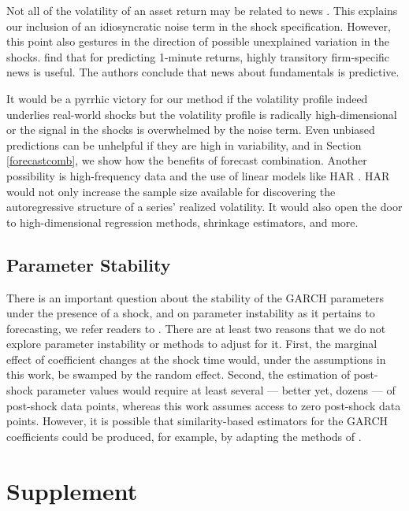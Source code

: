\documentclass[11pt,3p,review,authoryear]{elsarticle}
\theoremstyle{definition}
\begin{document}
Not all of the volatility of an asset return may be related to news \citep{boudoukh2019information}.  This explains our inclusion of an idiosyncratic noise term in the shock specification.  However, this point also gestures in the direction of possible unexplained variation in the shocks.  \citet{chinco2019sparse} find that for predicting 1-minute returns, highly transitory firm-specific news is useful.  The authors conclude that news about fundamentals is predictive.

It would be a pyrrhic victory for our method if the volatility profile indeed underlies real-world shocks but the volatility profile is radically high-dimensional or the signal in the shocks is overwhelmed by the noise term.  Even unbiased predictions can be unhelpful if they are high in variability, and in Section \ref{forecastcomb}, we show how the benefits of forecast combination.  Another possibility is high-frequency data and the use of linear models like HAR \citep{corsi2012har}.  HAR would not only increase the sample size available for discovering the autoregressive structure of a series' realized volatility.  It would also open the door to high-dimensional regression methods, shrinkage estimators, and more.

\subsection{Parameter Stability}

There is an important question about the stability of the GARCH parameters under the presence of a shock, and on parameter instability as it pertains to forecasting, we refer readers to \cite{rossi2013advances, rossi2021forecasting}.  There are at least two reasons that we do not explore parameter instability or methods to adjust for it.  First, the marginal effect of coefficient changes at the shock time would, under the assumptions in this work, be swamped by the random effect.  Second, the estimation of post-shock parameter values would require at least several --- better yet, dozens --- of post-shock data points, whereas this work assumes access to zero post-shock data points.  However, it is possible that similarity-based estimators for the GARCH coefficients could be produced, for example, by adapting the methods of \citet{dendramis2020similarity}.

\section{Supplement}
\end{document}
